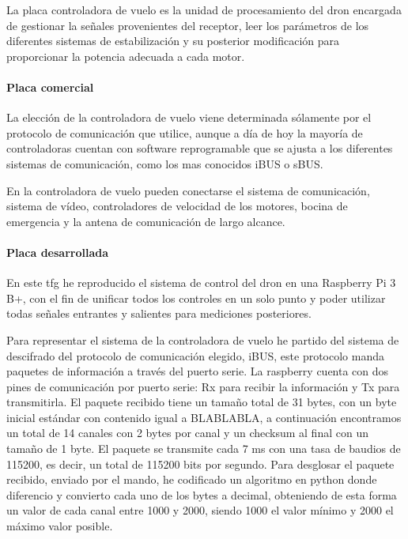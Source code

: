 	La placa controladora de vuelo es la unidad de procesamiento del dron encargada de gestionar la señales provenientes del receptor, leer los parámetros de los diferentes sistemas de estabilización y su posterior modificación para proporcionar la potencia adecuada a cada motor.
\paragraph{Placa comercial}
\label{SSSS:Placa comercial}
	La elección de la controladora de vuelo viene determinada sólamente por el protocolo de comunicación que utilice, aunque a día de hoy la mayoría de controladoras cuentan con software reprogramable que se ajusta a los diferentes sistemas de comunicación, como los mas conocidos iBUS o sBUS.
	

	En la controladora de vuelo pueden conectarse el sistema de comunicación, sistema de vídeo, controladores de velocidad de los motores, bocina de emergencia y la antena de comunicación de largo alcance.


\paragraph{Placa desarrollada}
\label{SSSS:Placa desarrollada}
	En este \ac{tfg} he reproducido el sistema de control del dron en una Raspberry Pi 3 B+, con el fin de unificar todos los controles en un solo punto y poder utilizar todas señales entrantes y salientes para mediciones posteriores.
	
	Para representar el sistema de la controladora de vuelo he partido del sistema de descifrado del protocolo de comunicación elegido, iBUS, este protocolo manda paquetes de información a través del puerto serie. La raspberry cuenta con dos pines de comunicación por puerto serie: Rx para recibir la información y Tx para transmitirla.
El paquete recibido tiene un tamaño total de 31 bytes, con un byte inicial estándar con contenido igual a BLABLABLA, a continuación encontramos un total de 14 canales con 2 bytes por canal y un checksum al final con un tamaño de 1 byte. El paquete se transmite cada 7 ms con una tasa de baudios de 115200, es decir, un total de 115200 bits por segundo.
Para desglosar el paquete recibido, enviado por el mando, he codificado un algoritmo en python donde diferencio y convierto cada uno de los bytes a decimal, obteniendo de esta forma un valor de cada canal entre 1000 y 2000, siendo 1000 el valor mínimo y 2000 el máximo valor posible.

